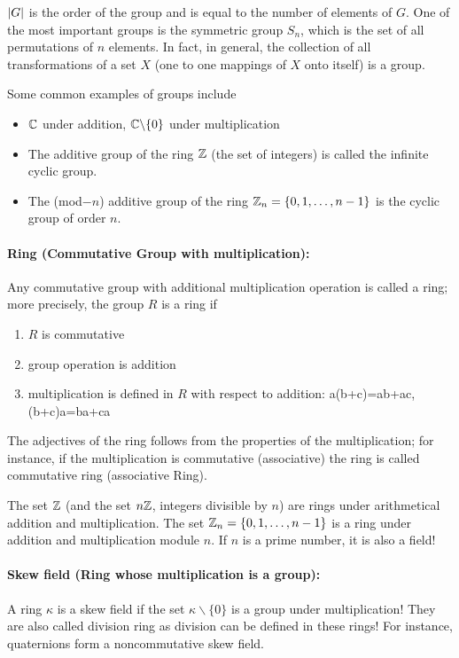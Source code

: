 \documentclass[12pt]{article}
\numberwithin{equation}{section}
\begin{document}
$\abs{G}$ is the order of the group and is equal to the number of elements of $G$. One of the most important groups is the symmetric group  $S_n$, which is the set of all permutations of $n$ elements. In fact, in general, the collection of all transformations of a set $X$ (one to one mappings of $X$ onto itself) is a group.

Some common examples of groups include
\begin{itemize}
	\item $\mathbb{C}$ under addition, $\mathbb{C}\backslash\{0\}$ under multiplication
	\item The additive group of the ring $\mathbb{Z}$ (the set of integers) is called the infinite cyclic group.
	\item The (mod$-n$) additive group of the ring $\mathbb{Z}_n=\{0,1,\dots,n-1\}$ is the cyclic group of order $n$.
\end{itemize}

\paragraph{Ring (Commutative Group with multiplication):} Any commutative group with additional multiplication operation is called a ring; more precisely, the group $R$ is a ring if
\begin{enumerate}
	\item $R$ is commutative
	\item group operation is addition
	\item multiplication is defined in $R$ with respect to addition:
	\be 
	a(b+c)=ab+ac\;,(b+c)a=ba+ca
	\ee 
\end{enumerate}
The adjectives of the ring follows from the properties of the multiplication; for instance, if the multiplication is commutative (associative) the ring is called commutative ring (associative Ring).

The set $\mathbb{Z}$ (and the set $n\mathbb{Z}$, integers divisible by $n$) are rings under arithmetical addition and multiplication. The set $\mathbb{Z}_n=\{0,1,\dots,n-1\}$ is a ring under addition and multiplication module $n$. If $n$ is a prime number, it is also a field!

\paragraph{Skew field (Ring whose multiplication is a group):}  A ring $\kappa$ is a skew field if the set $\kappa\backslash \{0\}$ is a group under multiplication! They are also called division ring as division can be defined in these rings! For instance, quaternions form a noncommutative skew field. 
\end{document}
